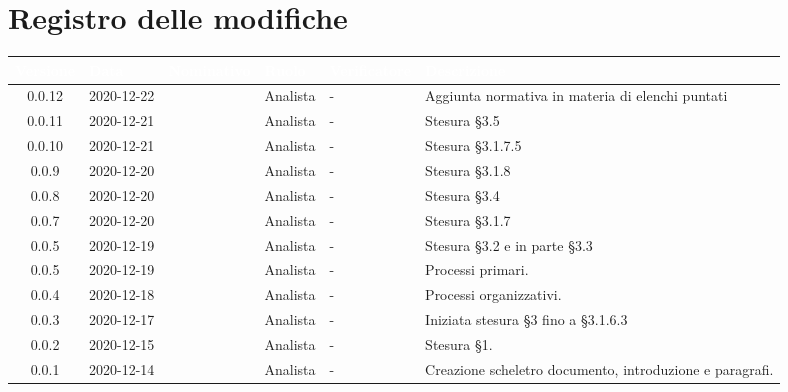 \section*{Registro delle modifiche}
\setcounter{table}{-1}
{

\renewcommand{\arraystretch}{1.5}
\centering
\begin{longtable}{c C{2.6cm} C{2.6cm} C{2.6cm} C{2.6cm} C{3.5cm}}
\textcolor{white}{\textbf{Versione}}&
\textcolor{white}{\textbf{Data}}&
\textcolor{white}{\textbf{Nominativo}}&
\textcolor{white}{\textbf{Ruolo}}&
\textcolor{white}{\textbf{Verificatore}}&
\textcolor{white}{\textbf{Descrizione}}\\	
\endhead

0.0.12 & 2020-12-22 & \PA{} & Analista & - & Aggiunta normativa in materia di elenchi puntati \\
0.0.11 & 2020-12-21 & \RA{} & Analista & - & Stesura \S 3.5 \\
0.0.10 & 2020-12-21 & \PA{} & Analista & - & Stesura \S 3.1.7.5 \\
0.0.9 & 2020-12-20 & \PA{} & Analista & - & Stesura \S 3.1.8 \\
0.0.8 & 2020-12-20 & \RA{} & Analista & - & Stesura \S 3.4 \\
0.0.7 & 2020-12-20 & \PA{} & Analista & - & Stesura \S 3.1.7 \\
0.0.5 & 2020-12-19 & \RA{} & Analista & - & Stesura \S 3.2 e in parte \S 3.3 \\
0.0.5 & 2020-12-19 & \ZM{} & Analista & - & Processi primari. \\
0.0.4 & 2020-12-18 & \SH{} & Analista & - & Processi organizzativi. \\
0.0.3 & 2020-12-17 & \PA{} & Analista & - & Iniziata stesura \S 3 fino a \S 3.1.6.3 \\
0.0.2 & 2020-12-15 & \PA{} & Analista & - & Stesura \S 1. \\
0.0.1 & 2020-12-14 & \ZM{} & Analista & - & Creazione scheletro documento, introduzione e paragrafi. \\
		
\end{longtable}
}
